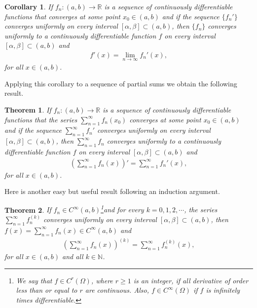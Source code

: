 \documentclass[11pt]{book}
\newtheorem{theorem}{Theorem}[chapter]
\newtheorem{corollary}{Corollary}[theorem]
\theoremstyle{definition}
\numberwithin{equation}{chapter}
\begin{document}
\medskip

\begin{corollary}
If $f_n: (a,b) \to \mathbb{R}$ is a sequence of continuously differentiable functions that converges at some point $x_0 \in (a,b)$ and if the sequence $\{f_n'\}$ converges uniformly on every interval $[\alpha,\beta] \subset (a,b)$, then $\{f_n\}$ converges uniformly to a continuously differentiable function $f$ on every interval $[\alpha,\beta] \subset (a,b)$ and
\begin{align*}
    f'(x) = \lim_{n\to\infty} f_n'(x),
\end{align*}
for all $x \in (a,b)$.
\end{corollary}

\medskip

Applying this corollary to a sequence of partial sums we obtain the following result.

\medskip

\begin{theorem}
If $f_n: (a,b) \to \mathbb{R}$ is a sequence of continuously differentiable functions that the series $\sum^\infty_{n=1} f_n(x_0)$ converges at some point $x_0 \in (a,b)$ and if the sequence $\sum^\infty_{n=1} f_n'$ converges uniformly on every interval $[\alpha,\beta] \subset (a,b)$, then $\sum^\infty_{n=1} f_n$ converges uniformly to a continuously differentiable function $f$ on every interval $[\alpha,\beta] \subset (a,b)$ and
\begin{align*}
    \left(\sum^\infty_{n=1} f_n(x)\right)' = \sum^\infty_{n=1} f_n'(x),
\end{align*}
for all $x \in (a,b)$.
\end{theorem}

\medskip

Here is another easy but useful result following an induction argument.

\medskip

\begin{theorem}\label{th_612}
If $f_n \in C^\infty(a,b)$\footnote{We say that $f \in C^r(\Omega)$, where $r \geq 1$ is an integer, if all derivative of order less than or equal to $r$ are continuous. Also, $f \in C^\infty(\Omega)$ if $f$ is infinitely times differentiable.}and for every $k = 0,1,2,\cdots$, the series $\sum^\infty_{n=1} f_n^{(k)}$ converges uniformly on every interval $[\alpha,\beta] \subset (a,b)$, then $f(x) = \sum^\infty_{n=1} f_n(x) \in C^\infty(a,b)$ and
\begin{align*}
    \left(\sum^\infty_{n=1} f_n(x)\right)^{(k)} = \sum^\infty_{n=1} f_n^{(k)}(x),
\end{align*}
for all $x \in (a,b)$ and all $k \in \mathbb{N}$.
\end{theorem}
\end{document}
